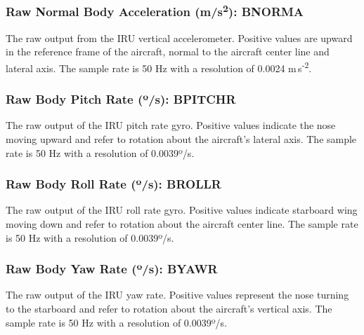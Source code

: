 \documentclass[
  english,
]{book}
\begin{document}
\hypertarget{bnorma}{%
\subsubsection*{\texorpdfstring{Raw Normal Body Acceleration (m/s\textsuperscript{2}): BNORMA}{Raw Normal Body Acceleration (m/s2): BNORMA}}\label{bnorma}}

The raw output from the IRU vertical accelerometer. Positive values are upward in the reference frame of the aircraft, normal to the aircraft center line and lateral axis. The sample rate is 50 Hz with a resolution of 0.0024 m s\textsuperscript{-2}.

\hypertarget{bpitchr}{%
\subsubsection*{\texorpdfstring{Raw Body Pitch Rate ({º}/s): BPITCHR}{Raw Body Pitch Rate (º/s): BPITCHR}}\label{bpitchr}}

The raw output of the IRU pitch rate gyro. Positive values indicate the nose moving upward and refer to rotation about the aircraft's lateral axis. The sample rate is 50 Hz with a resolution of 0.0039{º}/s.

\hypertarget{brollr}{%
\subsubsection*{\texorpdfstring{Raw Body Roll Rate ({º}/s): BROLLR}{Raw Body Roll Rate (º/s): BROLLR}}\label{brollr}}

The raw output of the IRU roll rate gyro. Positive values indicate starboard wing moving down and refer to rotation about the aircraft center line. The sample rate is 50 Hz with a resolution of 0.0039{º}/s.

\hypertarget{byawr}{%
\subsubsection*{\texorpdfstring{Raw Body Yaw Rate ({º}/s): BYAWR}{Raw Body Yaw Rate (º/s): BYAWR}}\label{byawr}}

The raw output of the IRU yaw rate. Positive values represent the nose turning to the starboard and refer to rotation about the aircraft's vertical axis. The sample rate is 50 Hz with a resolution of 0.0039{º}/s.
\end{document}
